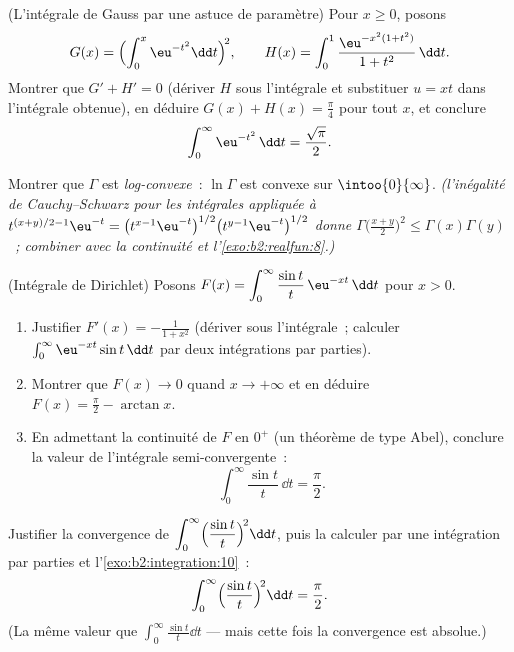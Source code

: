 \begin{exercise}[$\star\star\star$]\label{exo:b2:integration:8}
(L'intégrale de Gauss par une astuce de paramètre) Pour $x \geq 0$, posons
\[
G(x) = \Bigl(\int_0^x \eu^{-t^2}\dd t\Bigr)^{\!2},
\qquad
H(x) = \int_0^1 \frac{\eu^{-x^2(1+t^2)}}{1 + t^2}\,\dd t .
\]
Montrer que $G' + H' = 0$ (dériver $H$ sous l'intégrale et
substituer $u = xt$ dans l'intégrale obtenue), en déduire $G(x) + H(x)
= \frac\pi4$ pour tout $x$, et conclure
\[
\int_0^{\infty} \eu^{-t^2}\,\dd t = \frac{\sqrt\pi}{2} .
\]
\end{exercise}

\begin{exercise}[$\star\star\star$]\label{exo:b2:integration:9}
Montrer que $\Gamma$ est \emph{log-convexe}~: $\ln\Gamma$ est convexe sur
$\intoo{0}{\infty}$. \emph{(l'inégalité de Cauchy--Schwarz pour les intégrales appliquée
à $t^{(x+y)/2 - 1}\eu^{-t} = \bigl(t^{x-1}\eu^{-t}\bigr)^{1/2}
\bigl(t^{y-1}\eu^{-t}\bigr)^{1/2}$ donne
$\Gamma\bigl(\frac{x+y}{2}\bigr)^2 \leq \Gamma(x)\Gamma(y)$~;
combiner avec la continuité et l'\cref{exo:b2:realfun:8}.)}
\end{exercise}

\begin{exercise}[$\star\star\star$]\label{exo:b2:integration:10}
(Intégrale de Dirichlet) Posons $F(x) = \displaystyle\int_0^{\infty}
\frac{\sin t}{t}\,\eu^{-xt}\,\dd t$ pour $x > 0$.
\begin{enumerate}
  \item Justifier $F'(x) = -\frac{1}{1 + x^2}$ (dériver sous
        l'intégrale~; calculer $\int_0^\infty \eu^{-xt}\sin t\,\dd
        t$ par deux intégrations par parties).
  \item Montrer que $F(x) \to 0$ quand $x \to +\infty$ et en déduire $F(x) =
        \frac\pi2 - \arctan x$.
  \item En admettant la continuité de $F$ en $0^+$ (un théorème de type Abel),
        conclure la valeur de l'intégrale semi-convergente~:
        \[
        \int_0^{\infty} \frac{\sin t}{t}\,\dd t = \frac{\pi}{2}.
        \]
\end{enumerate}
\end{exercise}

\begin{exercise}[$\star\star$]\label{exo:b2:integration:11}
Justifier la convergence de $\displaystyle\int_0^\infty
\Bigl(\frac{\sin t}{t}\Bigr)^{\!2}\dd t$, puis la calculer par une
intégration par parties et l'\cref{exo:b2:integration:10}~:
\[
\int_0^\infty \Bigl(\frac{\sin t}{t}\Bigr)^{\!2}\dd t
= \frac{\pi}{2} .
\]
(La même valeur que $\int_0^\infty \frac{\sin t}{t}\dd t$ --- mais
cette fois la convergence est absolue.)
\end{exercise}

